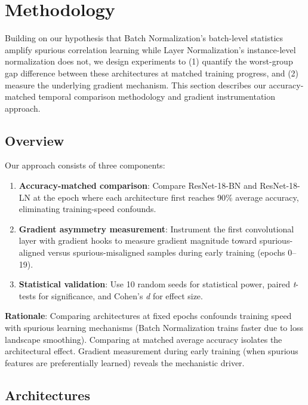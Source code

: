\section{Methodology}

Building on our hypothesis that Batch Normalization's batch-level statistics amplify spurious correlation learning while Layer Normalization's instance-level normalization does not, we design experiments to (1) quantify the worst-group gap difference between these architectures at matched training progress, and (2) measure the underlying gradient mechanism. This section describes our accuracy-matched temporal comparison methodology and gradient instrumentation approach.

\subsection{Overview}

Our approach consists of three components:

\begin{enumerate}
\item \textbf{Accuracy-matched comparison}: Compare ResNet-18-BN and ResNet-18-LN at the epoch where each architecture first reaches 90\% average accuracy, eliminating training-speed confounds.

\item \textbf{Gradient asymmetry measurement}: Instrument the first convolutional layer with gradient hooks to measure gradient magnitude toward spurious-aligned versus spurious-misaligned samples during early training (epochs 0--19).

\item \textbf{Statistical validation}: Use 10 random seeds for statistical power, paired \emph{t}-tests for significance, and Cohen's \emph{d} for effect size.
\end{enumerate}

\textbf{Rationale}: Comparing architectures at fixed epochs confounds training speed with spurious learning mechanisms (Batch Normalization trains faster due to loss landscape smoothing). Comparing at matched average accuracy isolates the architectural effect. Gradient measurement during early training (when spurious features are preferentially learned) reveals the mechanistic driver.

\subsection{Architectures}

